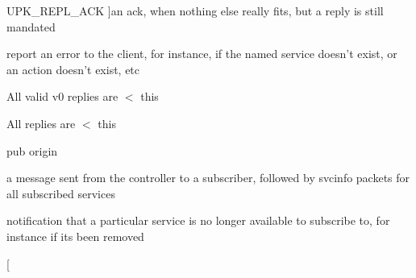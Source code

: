 \begin{Desc}
\begin{description}
{UPK\_\-REPL\_\-ACK\label{tp_8c_gab04f5fc5314f6296f0ef4b171d1b4282acbf1523c6bf5cc236d060d6d0ba7db2d}
}]an ack, when nothing else really fits, but a reply is still mandated \item[{\em 
UPK\_\-REPL\_\-ERROR\label{tp_8c_gab04f5fc5314f6296f0ef4b171d1b4282aa041df31800d879a09a3ce477e222c6d}
}]report an error to the client, for instance, if the named service doesn't exist, or an action doesn't exist, etc \item[{\em 
UPK\_\-REPL\_\-V0\_\-PROTO\_\-LIMIT\label{tp_8c_gab04f5fc5314f6296f0ef4b171d1b4282a2eb1a2fa31ca50bb78d16ce51c2c4524}
}]All valid v0 replies are $<$ this \item[{\em 
UPK\_\-REPL\_\-LIMIT\label{tp_8c_gab04f5fc5314f6296f0ef4b171d1b4282a02e71af273f9b7092b8cc2f782f3da5e}
}]All replies are $<$ this \item[{\em 
UPK\_\-PUB\_\-ORIGIN\label{tp_8c_gab04f5fc5314f6296f0ef4b171d1b4282a64e55f7bd2b88ea1d929a5e158b0a64b}
}]pub origin \item[{\em 
UPK\_\-PUB\_\-PUBLICATION\label{tp_8c_gab04f5fc5314f6296f0ef4b171d1b4282a0aca3ba5b1fdb79e07fb737421a3de5e}
}]a message sent from the controller to a subscriber, followed by svcinfo packets for all subscribed services \item[{\em 
UPK\_\-PUB\_\-CANCELATION\label{tp_8c_gab04f5fc5314f6296f0ef4b171d1b4282a3bbda7fcc6c4d7fc4a103003f65a8785}
}]notification that a particular service is no longer available to subscribe to, for instance if its been removed \item[{\em 
}
\end{description}
\end{Desc}
